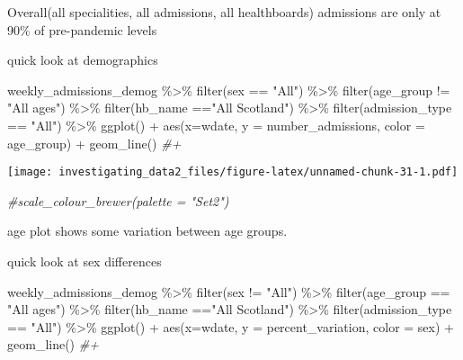 \documentclass[
]{article}
\newenvironment{Shaded}{\begin{snugshade}}{\end{snugshade}}
\newcommand{\AttributeTok}[1]{\textcolor[rgb]{0.77,0.63,0.00}{#1}}
\newcommand{\CommentTok}[1]{\textcolor[rgb]{0.56,0.35,0.01}{\textit{#1}}}
\newcommand{\FunctionTok}[1]{\textcolor[rgb]{0.00,0.00,0.00}{#1}}
\newcommand{\NormalTok}[1]{#1}
\newcommand{\SpecialCharTok}[1]{\textcolor[rgb]{0.00,0.00,0.00}{#1}}
\newcommand{\StringTok}[1]{\textcolor[rgb]{0.31,0.60,0.02}{#1}}
\begin{document}
Overall(all specialities, all admissions, all healthboards) admissions
are only at 90\% of pre-pandemic levels

quick look at demographics

\begin{Shaded}
\begin{Highlighting}[]
\NormalTok{weekly\_admissions\_demog }\SpecialCharTok{\%\textgreater{}\%} 
  \FunctionTok{filter}\NormalTok{(sex }\SpecialCharTok{==} \StringTok{"All"}\NormalTok{) }\SpecialCharTok{\%\textgreater{}\%} 
  \FunctionTok{filter}\NormalTok{(age\_group }\SpecialCharTok{!=} \StringTok{"All ages"}\NormalTok{) }\SpecialCharTok{\%\textgreater{}\%} 
  \FunctionTok{filter}\NormalTok{(hb\_name }\SpecialCharTok{==}\StringTok{"All Scotland"}\NormalTok{) }\SpecialCharTok{\%\textgreater{}\%} 
  \FunctionTok{filter}\NormalTok{(admission\_type }\SpecialCharTok{==} \StringTok{"All"}\NormalTok{) }\SpecialCharTok{\%\textgreater{}\%} 
\FunctionTok{ggplot}\NormalTok{() }\SpecialCharTok{+}
\FunctionTok{aes}\NormalTok{(}\AttributeTok{x=}\NormalTok{wdate, }\AttributeTok{y =}\NormalTok{ number\_admissions, }\AttributeTok{color =}\NormalTok{ age\_group) }\SpecialCharTok{+}
\FunctionTok{geom\_line}\NormalTok{() }\CommentTok{\#+}
\end{Highlighting}
\end{Shaded}

\texttt{[image: investigating\_data2\_files/figure-latex/unnamed-chunk-31-1.pdf]}

\begin{Shaded}
\begin{Highlighting}[]
\CommentTok{\#scale\_colour\_brewer(palette = "Set2") }
\end{Highlighting}
\end{Shaded}

age plot shows some variation between age groups.

quick look at sex differences

\begin{Shaded}
\begin{Highlighting}[]
\NormalTok{weekly\_admissions\_demog }\SpecialCharTok{\%\textgreater{}\%} 
  \FunctionTok{filter}\NormalTok{(sex }\SpecialCharTok{!=} \StringTok{"All"}\NormalTok{) }\SpecialCharTok{\%\textgreater{}\%} 
  \FunctionTok{filter}\NormalTok{(age\_group }\SpecialCharTok{==} \StringTok{"All ages"}\NormalTok{) }\SpecialCharTok{\%\textgreater{}\%} 
  \FunctionTok{filter}\NormalTok{(hb\_name }\SpecialCharTok{==}\StringTok{"All Scotland"}\NormalTok{) }\SpecialCharTok{\%\textgreater{}\%} 
  \FunctionTok{filter}\NormalTok{(admission\_type }\SpecialCharTok{==} \StringTok{"All"}\NormalTok{) }\SpecialCharTok{\%\textgreater{}\%} 
\FunctionTok{ggplot}\NormalTok{() }\SpecialCharTok{+}
\FunctionTok{aes}\NormalTok{(}\AttributeTok{x=}\NormalTok{wdate, }\AttributeTok{y =}\NormalTok{ percent\_variation, }\AttributeTok{color =}\NormalTok{ sex) }\SpecialCharTok{+}
\FunctionTok{geom\_line}\NormalTok{() }\CommentTok{\#+}
\end{Highlighting}
\end{Shaded}
\end{document}

